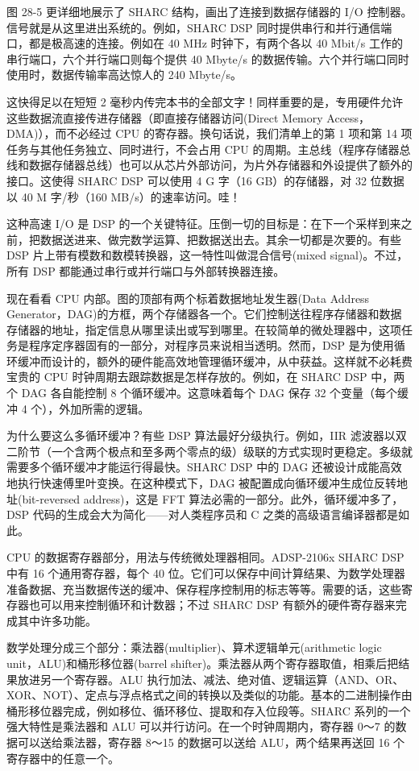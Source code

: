 图 28-5 更详细地展示了 SHARC 结构，画出了连接到数据存储器的 I/O
控制器。信号就是从这里进出系统的。例如，SHARC DSP
同时提供串行和并行通信端口，都是极高速的连接。例如在 40 MHz
时钟下，有两个各以 40 Mbit/s 工作的串行端口，六个并行端口则每个提供 40
Mbyte/s 的数据传输。六个并行端口同时使用时，数据传输率高达惊人的 240
Mbyte/s。

这快得足以在短短 2
毫秒内传完本书的全部文字！同样重要的是，专用硬件允许这些数据流直接传进存储器（即直接存储器访问(Direct
Memory Access，DMA)），而不必经过 CPU 的寄存器。换句话说，我们清单上的第
1 项和第 14 项任务与其他任务独立、同时进行，不会占用 CPU
的周期。主总线（程序存储器总线和数据存储器总线）也可以从芯片外部访问，为片外存储器和外设提供了额外的接口。这使得
SHARC DSP 可以使用 4 G 字（16 GB）的存储器，对 32 位数据以 40 M
字/秒（160 MB/s）的速率访问。哇！

这种高速 I/O 是 DSP
的一个关键特征。压倒一切的目标是：在下一个采样到来之前，把数据送进来、做完数学运算、把数据送出去。其余一切都是次要的。有些
DSP 片上带有模数和数模转换器，这一特性叫做混合信号(mixed
signal)。不过，所有 DSP 都能通过串行或并行端口与外部转换器连接。

现在看看 CPU 内部。图的顶部有两个标着数据地址发生器(Data Address
Generator，DAG)的方框，两个存储器各一个。它们控制送往程序存储器和数据存储器的地址，指定信息从哪里读出或写到哪里。在较简单的微处理器中，这项任务是程序定序器固有的一部分，对程序员来说相当透明。然而，DSP
是为使用循环缓冲而设计的，额外的硬件能高效地管理循环缓冲，从中获益。这样就不必耗费宝贵的
CPU 时钟周期去跟踪数据是怎样存放的。例如，在 SHARC DSP 中，两个 DAG
各自能控制 8 个循环缓冲。这意味着每个 DAG 保存 32 个变量（每个缓冲 4
个），外加所需的逻辑。

为什么要这么多循环缓冲？有些 DSP 算法最好分级执行。例如，IIR
滤波器以双二阶节（一个含两个极点和至多两个零点的级）级联的方式实现时更稳定。多级就需要多个循环缓冲才能运行得最快。SHARC
DSP 中的 DAG 还被设计成能高效地执行快速傅里叶变换。在这种模式下，DAG
被配置成向循环缓冲生成位反转地址(bit-reversed address)，这是 FFT
算法必需的一部分。此外，循环缓冲多了，DSP
代码的生成会大为简化------对人类程序员和 C
之类的高级语言编译器都是如此。

CPU 的数据寄存器部分，用法与传统微处理器相同。ADSP-2106x SHARC DSP 中有
16 个通用寄存器，每个 40
位。它们可以保存中间计算结果、为数学处理器准备数据、充当数据传送的缓冲、保存程序控制用的标志等等。需要的话，这些寄存器也可以用来控制循环和计数器；不过
SHARC DSP 有额外的硬件寄存器来完成其中许多功能。

数学处理分成三个部分：乘法器(multiplier)、算术逻辑单元(arithmetic logic
unit，ALU)和桶形移位器(barrel
shifter)。乘法器从两个寄存器取值，相乘后把结果放进另一个寄存器。ALU
执行加法、减法、绝对值、逻辑运算（AND、OR、XOR、NOT）、定点与浮点格式之间的转换以及类似的功能。基本的二进制操作由桶形移位器完成，例如移位、循环移位、提取和存入位段等。SHARC
系列的一个强大特性是乘法器和 ALU 可以并行访问。在一个时钟周期内，寄存器
0～7 的数据可以送给乘法器，寄存器 8～15 的数据可以送给
ALU，两个结果再送回 16 个寄存器中的任意一个。

